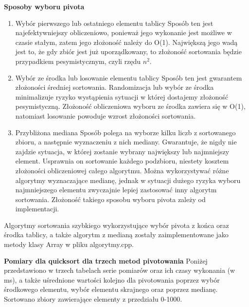 \documentclass[10pt, a4paper]{article}
\begin{document}
\begin{flushleft}
\textbf{Sposoby wyboru pivota}
\begin{enumerate}
\item Wybór pierwszego lub ostatniego elementu tablicy \newline
Sposób ten jest najefektywniejszy obliczeniowo, ponieważ jego wykonanie jest możliwe w czasie stałym, zatem jego złożoność należy do O(1). Największą jego wadą jest to, że gdy zbiór jest już uporządkowany, to złożoność sortowania będzie przypadkiem pesymistycznym, czyli rzędu $n^2$.
\item Wybór ze środka lub losowanie elementu tablicy \newline
Sposób ten jest gwarantem złożoności średniej sortowania. Randomizacja lub wybór ze środka minimalizuje ryzyko wystąpienia sytuacji w której dostajemy złożoność pesymistyczną. Złożoność obliczeniowa wyboru ze środka zawiera się w O(1), natomiast losowanie powoduje wzrost złożoności sortowania.
\item Przybliżona mediana \newline
Sposób polega na wyborze kilku liczb z sortowanego zbioru, a następnie wyznaczeniu z nich mediany. Gwarantuje, że nigdy nie zajdzie sytuacja, w której zostanie wybrany największy lub najmniejszy element. Usprawnia on sortowanie każdego podzbioru, niestety kosztem złożoności obliczeniowej całego algorytmu. Można wykorzystywać różne algorytmy wyznaczające medianę, jednak w sytuacji dużego ryzyka wyboru najmniejszego elementu zwyczajnie lepiej zastosować inny algorytm sortowania. Złożoność takiego sposobu wyboru pivota zależy od implementacji. \newline

\end{enumerate} 

Algorytmy sortowania szybkiego wykorzystujące wybór pivota z końca oraz środka tablicy, a także algorytm z medianą zostały zaimplementowane jako metody klasy Array w pliku algorytmy.cpp. \newline
\newpage

\textbf{Pomiary dla quicksort dla trzech metod pivotowania} \newline \newline
Poniżej przedstawiono w trzech tabelach serie pomiarów oraz ich czasy wykonania (w ms), a także uśrednione wartości kolejno dla pivotowania poprzez wybór środkowego elementu, wybór elementu skrajnego oraz poprzez medianę. Sortowano zbiory zawierające elementy z przedziału 0-1000.


\end{flushleft}
\end{document}
